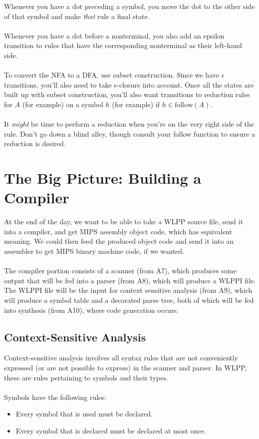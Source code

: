 \documentclass[]{article}
\theoremstyle{definition}
\newcommand{\lecture}[1]{\marginpar{{\footnotesize $\leftarrow$ \underline{#1}}}}
\begin{document}
				Whenever you have a dot preceding a symbol, you move the dot to the other side of that symbol and make \emph{that} rule a final state.
				\\ \\
				Whenever you have a dot before a nonterminal, you also add an epsilon transition to rules that have the corresponding nonterminal as their left-hand side.
				\\ \\
				To convert the NFA to a DFA, use subset construction. Since we have $\epsilon$ transitions, you'll also need to take $\epsilon$-closure into account. Once all the states are built up with subset construction, you'll also want transitions to reduction rules for $A$ (for example) on a symbol $h$ (for example) if $h \in \text{follow}(A)$. %
				\\ \\
				It \emph{might} be time to perform a reduction when you're on the very right side of the rule. Don't go down a blind alley, though \textendash{} consult your follow function to ensure a reduction is desired.

	\section{The Big Picture: Building a Compiler} \lecture{March 13, 2013}
		At the end of the day, we want to be able to take a WLPP source file, send it into a compiler, and get MIPS assembly object code, which has equivalent meaning. We could then feed the produced object code and send it into an assembler to get MIPS binary machine code, if we wanted.
		\\ \\
		The compiler portion consists of a scanner (from A7), which produces some output that will be fed into a parser (from A8), which will produce a WLPPI file. The WLPPI file will be the input for context sensitive analysis (from A9), which will produce a symbol table and a decorated parse tree, both of which will be fed into synthesis (from A10), where code generation occurs.
		
		\subsection{Context-Sensitive Analysis}
			Context-sensitive analysis involves all syntax rules that are not conveniently expressed (or are not possible to express) in the scanner and parser. In WLPP, these are rules pertaining to symbols and their types.
			\\ \\
			Symbols have the following rules:
			\begin{itemize}
				\item Every symbol that is used must be declared.
				\item Every symbol that is declared must be declared at most once.
			\end{itemize}
\end{document}
